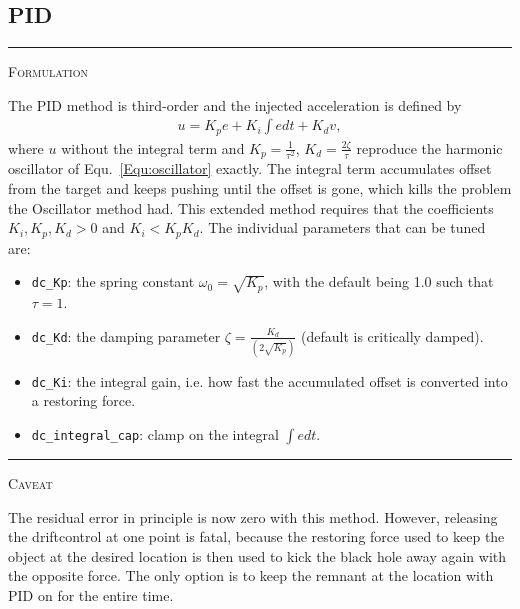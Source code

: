 \documentclass{article}
\newcommand{\var}[1]{%
  {\setlength{\fboxsep}{1.5pt}%
   \colorbox{varbg}{\textcolor{varfg}{\texttt{\small #1}}}}}
\newcommand{\step}[1]{%
  \par\medskip\noindent
  {\color{stepfg}\rule[-0.15ex]{2pt}{1.5ex}\hspace{0.5em}\scshape #1}%
  \hspace{0.75em}\ignorespaces}
\begin{document}
\subsection*{PID}
\step{Formulation} The PID method is third-order and the injected acceleration is defined by
\begin{align}\label{Equ:pid}
  u=K_pe+K_i\int edt+K_dv,
\end{align}
where $u$ without the integral term and $K_p=\frac{1}{\tau^2}$, $K_d=\frac{2\zeta}{\tau}$ reproduce the harmonic oscillator of
Equ.~\eqref{Equ:oscillator} exactly. The integral term accumulates offset from the target and keeps pushing until the offset is gone,
which kills the problem the Oscillator method had. This extended method requires that the coefficients $K_i,K_p,K_d>0$ and $K_i<K_pK_d$. The
individual parameters that can be tuned are:
\begin{itemize}
  \item \var{dc\_Kp}: the spring constant $\omega_0=\sqrt{K_p}$, with the default being 1.0 such that $\tau=1$.
  \item \var{dc\_Kd}: the damping parameter $\zeta=\frac{K_d}{(2\sqrt{K_p})}$ (default is critically damped).
  \item \var{dc\_Ki}: the integral gain, i.e. how fast the accumulated offset is converted into a restoring force.
  \item \var{dc\_integral\_cap}: clamp on the integral $\int edt$.
\end{itemize}
\step{Caveat} The residual error in principle is now zero with this method. However, releasing the driftcontrol at one point is fatal, because the
restoring force used to keep the object at the desired location is then used to kick the black hole away again with the opposite force. The only option is to
keep the remnant at the location with PID on for the entire time.
\end{document}
